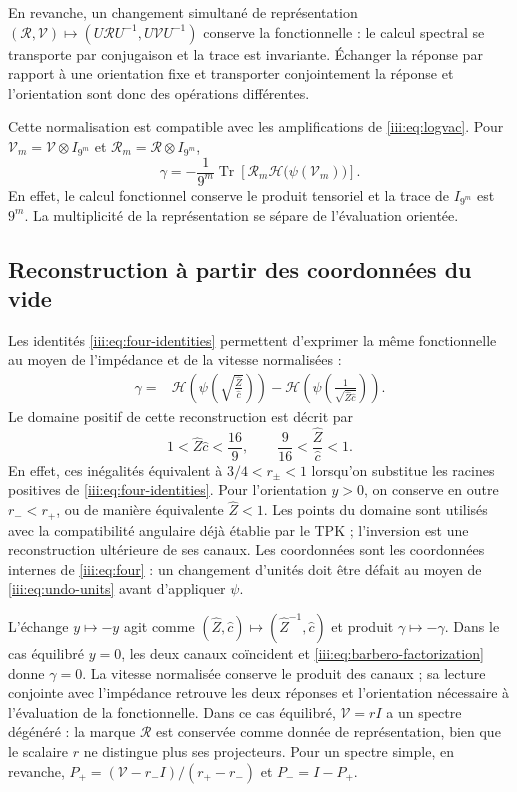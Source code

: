 En revanche, un changement simultané de représentation
$(\mathcal R,\mathcal V)\mapsto
(U\mathcal RU^{-1},U\mathcal VU^{-1})$ conserve la fonctionnelle :
le calcul spectral se transporte par conjugaison et la trace est
invariante. Échanger la réponse par rapport à une orientation fixe
et transporter conjointement la réponse et l’orientation sont donc
des opérations différentes.

Cette normalisation est compatible avec les amplifications de
\eqref{iii:eq:logvac}. Pour
$\mathcal V_m=\mathcal V\otimes I_{9^m}$ et
$\mathcal R_m=\mathcal R\otimes I_{9^m}$,
\begin{equation}
 \gamma=-\frac1{9^m}\operatorname{Tr}
 \left[\mathcal R_m\mathcal H\bigl(\psi(\mathcal V_m)\bigr)\right].
 \label{iii:eq:barbero-amplification}
\end{equation}
En effet, le calcul fonctionnel conserve le produit tensoriel et la trace
de $I_{9^m}$ est $9^m$. La multiplicité de la représentation se sépare
de l’évaluation orientée.

\subsection{Reconstruction à partir des coordonnées du vide}

Les identités \eqref{iii:eq:four-identities} permettent d’exprimer la même
fonctionnelle au moyen de l’impédance et de la vitesse normalisées :
\begin{align}
 \gamma={}&
 \mathcal H\!\left(\psi\!\left(
     \sqrt{\frac{\widehat Z}{\widehat c}}\right)\right)
 -\mathcal H\!\left(\psi\!\left(
     \frac1{\sqrt{\widehat Z\widehat c}}\right)\right).
 \label{iii:eq:barbero-zc}
\end{align}
Le domaine positif de cette reconstruction est décrit par
\begin{equation}
 1<\widehat Z\widehat c<\frac{16}{9},\qquad
 \frac9{16}<\frac{\widehat Z}{\widehat c}<1.
 \label{iii:eq:barbero-zc-domain}
\end{equation}
En effet, ces inégalités équivalent à
$3/4<r_\pm<1$ lorsqu’on substitue les racines positives de
\eqref{iii:eq:four-identities}. Pour l’orientation $y>0$, on conserve
en outre $r_-<r_+$, ou de manière équivalente $\widehat Z<1$. Les points du
domaine sont utilisés avec la compatibilité angulaire déjà établie par
le TPK ; l’inversion est une reconstruction ultérieure de ses canaux.
Les coordonnées sont les coordonnées internes de \eqref{iii:eq:four} : un changement
d’unités doit être défait au moyen de \eqref{iii:eq:undo-units} avant
d’appliquer $\psi$.

L’échange $y\mapsto-y$ agit comme
$(\widehat Z,\widehat c)\mapsto(\widehat Z^{-1},\widehat c)$ et
produit $\gamma\mapsto-\gamma$. Dans le cas équilibré $y=0$,
les deux canaux coïncident et \eqref{iii:eq:barbero-factorization} donne
$\gamma=0$. La vitesse normalisée conserve le produit des
canaux ; sa lecture conjointe avec l’impédance retrouve les deux
réponses et l’orientation nécessaire à l’évaluation de la fonctionnelle.
Dans ce cas équilibré, $\mathcal V=rI$ a un spectre dégénéré :
la marque $\mathcal R$ est conservée comme donnée de représentation, bien que
le scalaire $r$ ne distingue plus ses projecteurs. Pour un spectre simple,
en revanche,
$P_+=(\mathcal V-r_-I)/(r_+-r_-)$ et $P_-=I-P_+$.
